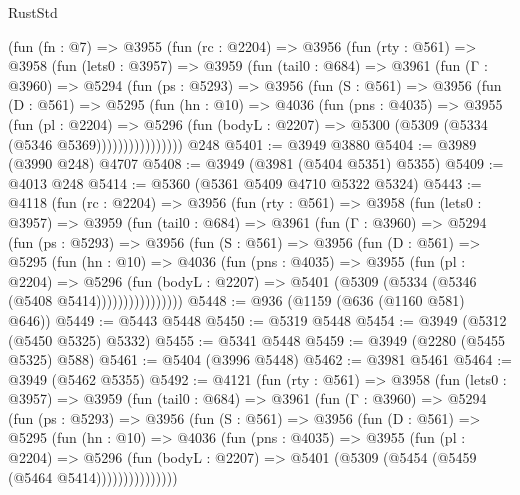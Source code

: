 \begin{lexlean}{RustStd}
\begin{coremodule}
    (fun (fn : @7) =>
    @3955
      (fun (rc : @2204) =>
      @3956
        (fun (rty : @561) =>
        @3958
          (fun (lets0 : @3957) =>
          @3959
            (fun (tail0 : @684) =>
            @3961
              (fun (Γ : @3960) =>
              @5294
                (fun (ps : @5293) =>
                @3956
                  (fun (S : @561) =>
                  @3956
                    (fun (D : @561) =>
                    @5295
                      (fun (hn : @10) =>
                      @4036
                        (fun (pns : @4035) =>
                        @3955
                          (fun (pl : @2204) =>
                          @5296
                            (fun (bodyL : @2207) => @5300 (@5309 (@5334 (@5346 @5369))))))))))))))))
    @248
@5401 := @3949 @3880
@5404 := @3989 (@3990 @248) @4707
@5408 := @3949 (@3981 (@5404 @5351) @5355)
@5409 := @4013 @248
@5414 := @5360 (@5361 @5409 @4710 @5322 @5324)
@5443 := @4118
    (fun (rc : @2204) =>
    @3956
      (fun (rty : @561) =>
      @3958
        (fun (lets0 : @3957) =>
        @3959
          (fun (tail0 : @684) =>
          @3961
            (fun (Γ : @3960) =>
            @5294
              (fun (ps : @5293) =>
              @3956
                (fun (S : @561) =>
                @3956
                  (fun (D : @561) =>
                  @5295
                    (fun (hn : @10) =>
                    @4036
                      (fun (pns : @4035) =>
                      @3955
                        (fun (pl : @2204) =>
                        @5296
                          (fun (bodyL : @2207) =>
                          @5401 (@5309 (@5334 (@5346 (@5408 @5414))))))))))))))))
@5448 := @936 (@1159 (@636 (@1160 @581) @646))
@5449 := @5443 @5448
@5450 := @5319 @5448
@5454 := @3949 (@5312 (@5450 @5325) @5332)
@5455 := @5341 @5448
@5459 := @3949 (@2280 (@5455 @5325) @588)
@5461 := @5404 (@3996 @5448)
@5462 := @3981 @5461
@5464 := @3949 (@5462 @5355)
@5492 := @4121
    (fun (rty : @561) =>
    @3958
      (fun (lets0 : @3957) =>
      @3959
        (fun (tail0 : @684) =>
        @3961
          (fun (Γ : @3960) =>
          @5294
            (fun (ps : @5293) =>
            @3956
              (fun (S : @561) =>
              @3956
                (fun (D : @561) =>
                @5295
                  (fun (hn : @10) =>
                  @4036
                    (fun (pns : @4035) =>
                    @3955
                      (fun (pl : @2204) =>
                      @5296
                        (fun (bodyL : @2207) =>
                        @5401 (@5309 (@5454 (@5459 (@5464 @5414)))))))))))))))

\end{coremodule}
\end{lexlean}
